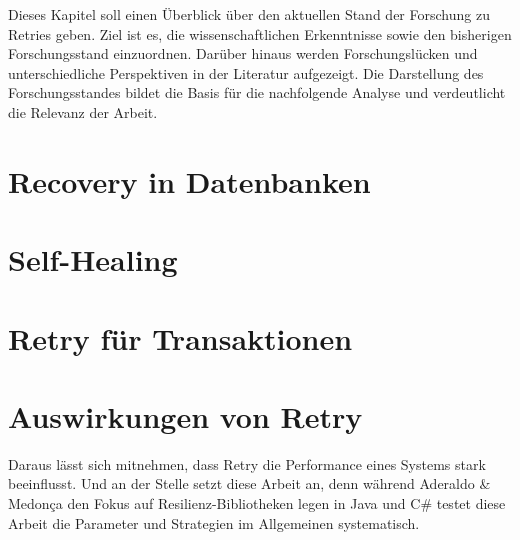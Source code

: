 
Dieses Kapitel soll einen Überblick über den aktuellen Stand der Forschung zu Retries geben.
Ziel ist es, die wissenschaftlichen Erkenntnisse sowie den bisherigen Forschungsstand einzuordnen.
Darüber hinaus werden Forschungslücken und unterschiedliche Perspektiven in der Literatur aufgezeigt.
Die Darstellung des Forschungsstandes bildet die Basis für die nachfolgende Analyse und verdeutlicht die Relevanz
der Arbeit.

\section{Recovery in Datenbanken}
\label{sec:recovery}


\section{Self-Healing}
\label{sec:selfHealing}


\section{Retry für Transaktionen}
\label{sec:retryTransaction}


\section{Auswirkungen von Retry}
\label{sec:effectsOnSystem}


Daraus lässt sich mitnehmen, dass Retry die Performance eines Systems stark beeinflusst.
Und an der Stelle setzt diese Arbeit an, denn während Aderaldo \& Medonça den Fokus auf Resilienz-Bibliotheken legen
in Java und C\# testet diese Arbeit die Parameter und Strategien im Allgemeinen systematisch.
